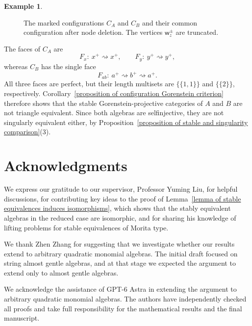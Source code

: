 \documentclass[11pt]{article}
\newcommand{\ww}{\mathsf{w}}
\theoremstyle{definition}
\newtheorem{example}[theorem]{Example}
\begin{document}
\begin{example}
\begin{figure}[htbp]
				\caption{The marked configurations $C_A$ and $C_B$ and their common
					configuration after node deletion.
					The vertices $\ww_z^\pm$ are truncated.}
				\label{figure of marked configuration comparison}
			\end{figure}

			The faces of $C_A$ are
			\[
				F_x:\ x^+\rightsquigarrow x^+,\qquad
				F_y:\ y^+\rightsquigarrow y^+,
			\]
			whereas $C_B$ has the single face
			\[
				F_{ab}:\ a^+\rightsquigarrow b^+\rightsquigarrow a^+.
			\]
			All three faces are perfect, but their length multisets are $\{\!\{1,1\}\!\}$ and $\{\!\{2\}\!\}$, respectively. Corollary~\ref{proposition of configuration Gorenstein criterion} therefore shows that the stable Gorenstein-projective categories of $A$ and $B$ are not triangle equivalent. Since both algebras are selfinjective, they are not singularly equivalent either, by Proposition~\ref{proposition of stable and singularity comparison}(3).
		\end{example}



\section*{Acknowledgments}

	We express our gratitude to our supervisor, Professor Yuming Liu, for helpful discussions, for contributing key ideas to the proof of Lemma~\ref{lemma of stable equivalences induces isomorphisms}, which shows that the stably equivalent algebras in the reduced case are isomorphic, and for sharing his knowledge of lifting problems for stable equivalences of Morita type.

	We thank Zhen Zhang for suggesting that we investigate whether our results extend to arbitrary quadratic monomial algebras.
	The initial draft focused on string almost gentle algebras, and at that stage we expected the argument to extend only to almost gentle algebras.

	We acknowledge the assistance of GPT-6 Astra in extending the argument to arbitrary quadratic monomial algebras. The authors have independently checked all proofs and take full responsibility for the mathematical results and the final manuscript.

    

\begingroup\linespread{1}\selectfont


\endgroup
\end{document}
